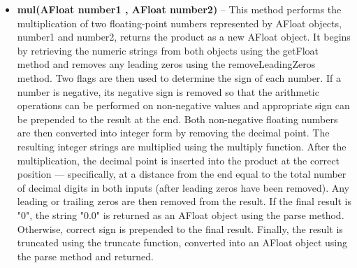 \documentclass[a4paper,12pt]{article}
\begin{document}
\begin{itemize}
    \item \textbf{mul(AFloat number1 , AFloat number2)} -- This method performs the multiplication of two floating-point numbers represented by AFloat objects, number1 and number2, returns the product as a new AFloat object. It begins by retrieving the numeric strings from both objects using the getFloat method and removes any leading zeros using the removeLeadingZeros method. Two flags are then used to determine the sign of each number. If a number is negative, its negative sign is removed so that the arithmetic operations can be performed on non-negative values and appropriate sign can be prepended to the result at the end. Both non-negative floating numbers are then converted into integer form by removing the decimal point. The resulting integer strings are multiplied using the multiply function. After the multiplication, the decimal point is inserted into the product at the correct position — specifically, at a distance from the end equal to the total number of decimal digits in both inputs (after leading zeros have been removed). Any leading or trailing zeros are then removed from the result. If the final result is "0", the string "0.0" is returned as an AFloat object using the parse method. Otherwise, correct sign is prepended to the final result. Finally, the result is truncated using the truncate function, converted into an AFloat object using the parse method and returned.\\ 


\end{itemize}
\end{document}
